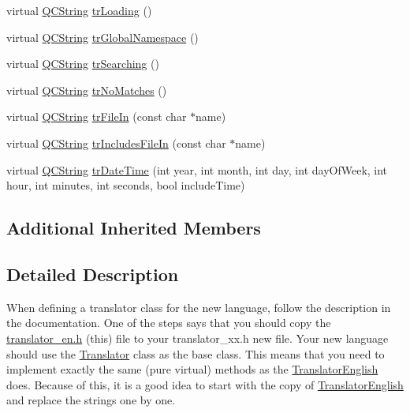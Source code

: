 \begin{DoxyCompactItemize}
\item 
virtual \mbox{\hyperlink{class_q_c_string}{Q\+C\+String}} \mbox{\hyperlink{class_translator_turkish_a898a1a94072a02847448fb48ef8bc9ca}{tr\+Loading}} ()
\item 
virtual \mbox{\hyperlink{class_q_c_string}{Q\+C\+String}} \mbox{\hyperlink{class_translator_turkish_ad39723d98618b6290087ca4a2f9fac6d}{tr\+Global\+Namespace}} ()
\item 
virtual \mbox{\hyperlink{class_q_c_string}{Q\+C\+String}} \mbox{\hyperlink{class_translator_turkish_ae899bb675e3b8f4a53cefc32b9138575}{tr\+Searching}} ()
\item 
virtual \mbox{\hyperlink{class_q_c_string}{Q\+C\+String}} \mbox{\hyperlink{class_translator_turkish_a4c731a9c91e85d6f7a9c1381303c870f}{tr\+No\+Matches}} ()
\item 
virtual \mbox{\hyperlink{class_q_c_string}{Q\+C\+String}} \mbox{\hyperlink{class_translator_turkish_add0665e9dea47ca2d5a99afc4b9da1af}{tr\+File\+In}} (const char $\ast$name)
\item 
virtual \mbox{\hyperlink{class_q_c_string}{Q\+C\+String}} \mbox{\hyperlink{class_translator_turkish_a863e8639af2855d5c9aed573d4ecfa79}{tr\+Includes\+File\+In}} (const char $\ast$name)
\item 
virtual \mbox{\hyperlink{class_q_c_string}{Q\+C\+String}} \mbox{\hyperlink{class_translator_turkish_a5d517565cb0e2aa4dfc9d070f0788776}{tr\+Date\+Time}} (int year, int month, int day, int day\+Of\+Week, int hour, int minutes, int seconds, bool include\+Time)
\end{DoxyCompactItemize}
\subsection*{Additional Inherited Members}


\subsection{Detailed Description}
When defining a translator class for the new language, follow the description in the documentation. One of the steps says that you should copy the \mbox{\hyperlink{translator__en_8h_source}{translator\+\_\+en.\+h}} (this) file to your translator\+\_\+xx.\+h new file. Your new language should use the \mbox{\hyperlink{class_translator}{Translator}} class as the base class. This means that you need to implement exactly the same (pure virtual) methods as the \mbox{\hyperlink{class_translator_english}{Translator\+English}} does. Because of this, it is a good idea to start with the copy of \mbox{\hyperlink{class_translator_english}{Translator\+English}} and replace the strings one by one.

